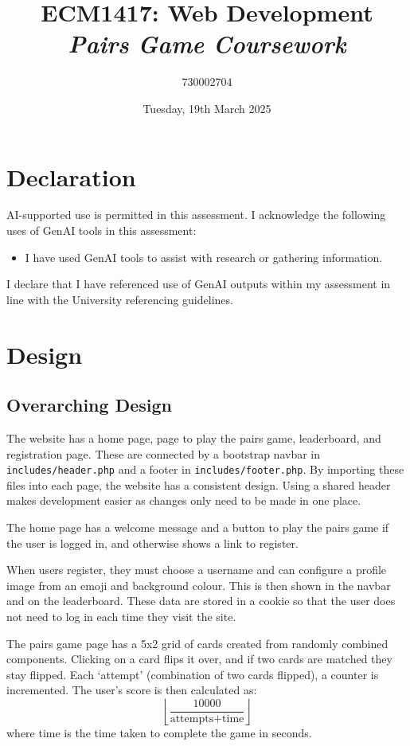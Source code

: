\documentclass{article}
\title{\textbf{ECM1417: Web Development} \\ \textit{Pairs Game Coursework}}
\author{730002704}
\date{Tuesday, 19th March 2025}
\begin{document}
\maketitle
\tableofcontents

\section*{Declaration}
AI-supported use is permitted in this assessment. I acknowledge the following uses of GenAI tools in this assessment:
\begin{itemize}
    \item I have used GenAI tools to assist with research or gathering information.
\end{itemize}
I declare that I have referenced use of GenAI outputs within my assessment in line with the University referencing guidelines.

\section{Design}
\subsection{Overarching Design}
The website has a home page, page to play the pairs game, leaderboard, and registration page. These are connected by a bootstrap navbar in \texttt{includes/header.php} and a footer in \texttt{includes/footer.php}. By importing these files into each page, the website has a consistent design. Using a shared header makes development easier as changes only need to be made in one place.

The home page has a welcome message and a button to play the pairs game if the user is logged in, and otherwise shows a link to register.

When users register, they must choose a username and can configure a profile image from an emoji and background colour. This is then shown in the navbar and on the leaderboard. These data are stored in a cookie so that the user does not need to log in each time they visit the site.

The pairs game page has a 5x2 grid of cards created from randomly combined components. Clicking on a card flips it over, and if two cards are matched they stay flipped. Each `attempt' (combination of two cards flipped), a counter is incremented. The user's score is then calculated as:
\begin{equation*}
    \left\lfloor \frac{10000}{\text{attempts} + \text{time}} \right\rfloor
\end{equation*}
where time is the time taken to complete the game in seconds.
\end{document}

